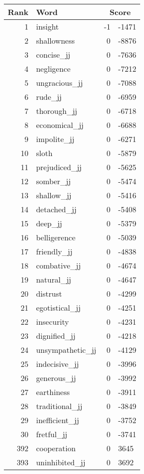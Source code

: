 \begin{longtable}[!htbp]{| rlr@{.}l |}
    \hline
    \textbf{Rank} & \textbf{Word} & \multicolumn{2}{c|}{\textbf{Score}} \\
    \hline
    \endhead
    1 & insight & -1 & -1471 \\
    2 & shallowness & 0 & -8876 \\
    3 & concise\_jj & 0 & -7636 \\
    4 & negligence & 0 & -7212 \\
    5 & ungracious\_jj & 0 & -7088 \\
    6 & rude\_jj & 0 & -6959 \\
    7 & thorough\_jj & 0 & -6718 \\
    8 & economical\_jj & 0 & -6688 \\
    9 & impolite\_jj & 0 & -6271 \\
    10 & sloth & 0 & -5879 \\
    11 & prejudiced\_jj & 0 & -5625 \\
    12 & somber\_jj & 0 & -5474 \\
    13 & shallow\_jj & 0 & -5416 \\
    14 & detached\_jj & 0 & -5408 \\
    15 & deep\_jj & 0 & -5379 \\
    16 & belligerence & 0 & -5039 \\
    17 & friendly\_jj & 0 & -4838 \\
    18 & combative\_jj & 0 & -4674 \\
    19 & natural\_jj & 0 & -4647 \\
    20 & distrust & 0 & -4299 \\
    21 & egotistical\_jj & 0 & -4251 \\
    22 & insecurity & 0 & -4231 \\
    23 & dignified\_jj & 0 & -4218 \\
    24 & unsympathetic\_jj & 0 & -4129 \\
    25 & indecisive\_jj & 0 & -3996 \\
    26 & generous\_jj & 0 & -3992 \\
    27 & earthiness & 0 & -3911 \\
    28 & traditional\_jj & 0 & -3849 \\
    29 & inefficient\_jj & 0 & -3752 \\
    30 & fretful\_jj & 0 & -3741 \\
    392 & cooperation & 0 & 3645 \\
    393 & uninhibited\_jj & 0 & 3692 \\

\end{longtable}
